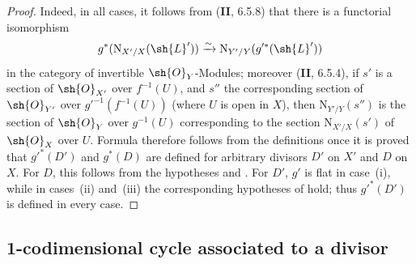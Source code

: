 \begin{proof}
Indeed, in all cases, it follows from (\textbf{II}, 6.5.8) that there is a functorial isomorphism
\[
  g^*(\mathrm{N}_{X'/X}(\sh{L}'))\xrightarrow{\sim}\mathrm{N}_{Y'/Y}(g'^*(\sh{L}'))
\]
in the category of invertible $\sh{O}_Y$-Modules;
moreover (\textbf{II}, 6.5.4), if $s'$ is a section of $\sh{O}_{X'}$ over $f^{-1}(U)$, and $s''$ the corresponding section of $\sh{O}_{Y'}$ over $g'^{-1}(f^{-1}(U))$ (where $U$ is open in $X$), then $\mathrm{N}_{Y'/Y}(s'')$ is the section of $\sh{O}_Y$ over $g^{-1}(U)$ corresponding to the section $\mathrm{N}_{X'/X}(s')$ of $\sh{O}_X$ over $U$.
Formula  therefore follows from the definitions once it is proved that $g'^*(D')$ and $g^*(D)$ are defined for arbitrary divisors $D'$ on $X'$ and $D$ on $X$.
For $D$, this follows from the hypotheses and .
For $D'$, $g'$ is flat in case~(i), while in cases~(ii) and~(iii) the corresponding hypotheses of  hold;
thus $g'^*(D')$ is defined in every case.
\end{proof}
\subsection{1-codimensional cycle associated to a divisor}
\label{subsection:IV.21.6}



